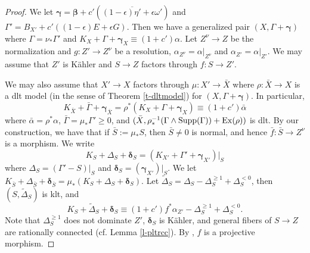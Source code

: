 \documentclass[11pt]{amsart}
\numberwithin{equation}{section}
\def\bbeta{\boldsymbol{\beta}}
\def\ggamma{\boldsymbol{\gamma}}
\def\ddelta{\boldsymbol{\delta}}
\def\rrho{\boldsymbol{\rho}}
\theoremstyle{definition}
\theoremstyle{definition}
\theoremstyle{definition}
\begin{document}
\begin{proof}
We let $\ggamma =\bbeta+c'\left( \overline{(1-\epsilon)\eta'+\epsilon \omega ' }\right)$ and $\Gamma '=B_{X'}+c'((1-\epsilon)E+\epsilon G)$. Then we have a generalized pair $(X,\Gamma +\ggamma)$ where $\Gamma=\nu _*\Gamma'$ and  
 $K_X+\Gamma+\ggamma _X\equiv (1+c')\alpha$. Let $Z^\nu\to Z$ be the normalization and $g:Z'\to Z^\nu$ be a resolution, $\alpha_{Z^\nu}=\alpha |_{Z^\nu}$ and $\alpha _{Z'}=\alpha |_{Z'}$. We may assume that $Z'$ is K\"ahler and $S\to Z$ factors through $f:S\to Z'$. 
\begin{center}
\end{center}
We may also assume that $X'\to X$ factors through $\mu :X'\to \bar X$ where $\rho:\bar X\to X$ is a dlt model (in the sense of Theorem \ref{t-dltmodel}) for $(X,\Gamma+\ggamma  )$. In particular, \[K_{\bar X}+\bar \Gamma+\ggamma_{\bar X}=\rho ^*(K_X+\Gamma +\ggamma _X)\equiv (1+c')\bar \alpha\] where $\bar \alpha =\rho ^*\alpha$, $\bar \Gamma =\mu _*\Gamma' \geq 0$, and $(\bar X,\rho ^{-1}_*(\Gamma\wedge {\rm Supp}(\Gamma)) +{\rm Ex}(\rho))$ is dlt. By our construction, we have that if $\bar S:=\mu _* S$, then $\bar S\ne 0$ is normal, and hence $\bar f:\bar S\to Z^\nu$ is a morphism.
 We write
\[K_S+\Delta _S+\ddelta _S=(K_{X'}+\Gamma '+\ggamma_{X'} )|_{S}\]
where $\Delta _S=(\Gamma '-S)|_S$ and $\ddelta _S=(\ggamma _{X'})|_{S}$. We let $K_{\bar S}+\Delta _{\bar S}+\ddelta _{\bar S}=\mu _*(K_S+\Delta _S+\ddelta _S)$.
Let  $\tilde \Delta _S=\Delta _S-\Delta _S^{\geq 1}+\Delta _S^{<0}$, then $(S,\tilde \Delta _S)$ is klt, and
\[ K_S+\tilde \Delta _S+\ddelta _S\equiv (1+c')f^*\alpha _{Z'} -\Delta _S^{\geq 1}+\Delta _S^{<0}.\]
Note that $\Delta _S^{\geq 1}$ does not dominate $Z'$, $\ddelta _S$ is K\"ahler, and general fibers of $S\to Z$ are rationally connected (cf. Lemma \ref{l-pltrcc}).  By \cite[Theorem 3.1]{CH24}, $f$ is a projective morphism. %


\end{proof}
\end{document}
